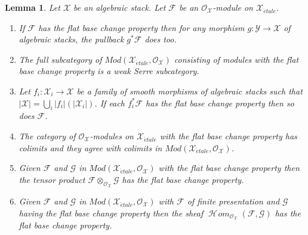 \documentclass{stacks-project}
\theoremstyle{plain}
\newtheorem{lemma}[subsection]{Lemma}
\theoremstyle{definition}
\theoremstyle{remark}
\numberwithin{equation}{subsection}
\def\SheafHom{\mathop{\mathcal{H}\!\mathit{om}}\nolimits}
\def\etale{{\acute{e}tale}}
\begin{document}
\begin{lemma}
\label{lemma-check-flat-comparison-on-etale-covering}
Let $\mathcal{X}$ be an algebraic stack. Let $\mathcal{F}$
be an $\mathcal{O}_\mathcal{X}$-module on $\mathcal{X}_\etale$.
\begin{enumerate}
\item If $\mathcal{F}$ has the flat base change property then for any morphism
$g : \mathcal{Y} \to \mathcal{X}$ of algebraic stacks, the
pullback $g^*\mathcal{F}$ does too.
\item The full subcategory of
$\textit{Mod}(\mathcal{X}_\etale, \mathcal{O}_\mathcal{X})$
consisting of modules with the flat base change property
is a weak Serre subcategory.
\item  Let $f_i : \mathcal{X}_i \to \mathcal{X}$ be a family of
smooth morphisms of algebraic stacks such that
$|\mathcal{X}| = \bigcup_i |f_i|(|\mathcal{X}_i|)$. If each
$f_i^*\mathcal{F}$ has the flat base change property then so does
$\mathcal{F}$.
\item The category of $\mathcal{O}_\mathcal{X}$-modules
on $\mathcal{X}_\etale$ with the flat base change property
has colimits and they agree with colimits in
$\textit{Mod}(\mathcal{X}_\etale, \mathcal{O}_\mathcal{X})$.
\item Given $\mathcal{F}$ and $\mathcal{G}$ in
$\textit{Mod}(\mathcal{X}_\etale, \mathcal{O}_\mathcal{X})$
with the flat base change property then the tensor product
$\mathcal{F} \otimes_{\mathcal{O}_\mathcal{X}} \mathcal{G}$
has the flat base change property.
\item Given $\mathcal{F}$ and $\mathcal{G}$ in
$\textit{Mod}(\mathcal{X}_\etale, \mathcal{O}_\mathcal{X})$
with $\mathcal{F}$ of finite presentation and $\mathcal{G}$ having
the flat base change property then the sheaf
$\SheafHom_{\mathcal{O}_\mathcal{X}}(\mathcal{F}, \mathcal{G})$
has the flat base change property.
\end{enumerate}
\end{lemma}
\end{document}
